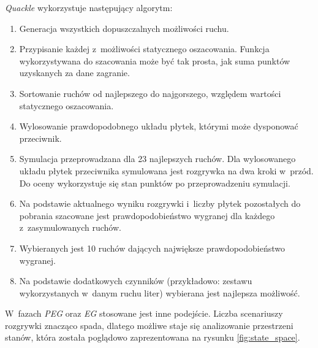 \documentclass[a4paper,twocolumn,12pt]{article}
\begin{document}
\emph{Quackle} wykorzystuje następujący algorytm:

\begin{enumerate}
 \item Generacja wszystkich dopuszczalnych możliwości ruchu.
 \item Przypisanie każdej z~możliwości statycznego oszacowania. Funkcja wykorzystywana do szacowania może być tak prosta, jak suma punktów uzyskanych za dane zagranie.
 \item Sortowanie ruchów od najlepszego do najgorszego, względem wartości statycznego oszacowania.
 \item Wylosowanie prawdopodobnego układu płytek, którymi może dysponować przeciwnik.
 \item Symulacja przeprowadzana dla 23 najlepszych ruchów. Dla wylosowanego układu płytek przeciwnika symulowana jest rozgrywka na dwa kroki w~przód. Do oceny wykorzystuje się stan punktów po przeprowadzeniu symulacji.
 \item Na podstawie aktualnego wyniku rozgrywki i~liczby płytek pozostałych do pobrania szacowane jest prawdopodobieństwo wygranej dla każdego z~zasymulowanych ruchów.
 \item Wybieranych jest 10 ruchów dających największe prawdopodobieństwo wygranej.
 \item Na podstawie dodatkowych czynników (przykładowo: zestawu wykorzystanych w~danym ruchu liter) wybierana jest najlepsza możliwość.
\end{enumerate}

W~fazach \emph{PEG} oraz \emph{EG} stosowane jest inne podejście. Liczba scenariuszy rozgrywki znacząco spada, dlatego możliwe staje się analizowanie przestrzeni stanów, która została poglądowo zaprezentowana na rysunku \ref{fig:state_space}. 
\end{document}
